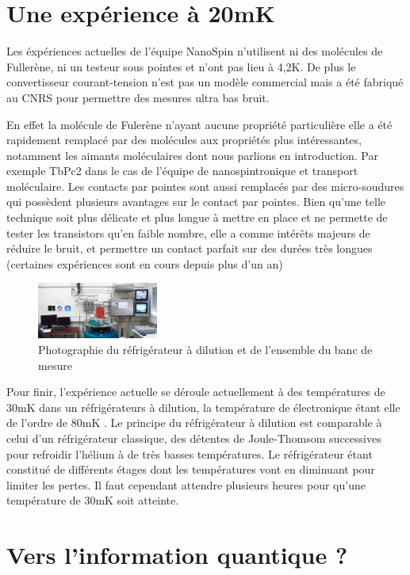 \section{Une expérience à 20mK}
Les éxpériences actuelles de l'équipe NanoSpin n'utilisent ni des molécules de Fullerène, ni un testeur sous pointes et n'ont pas lieu à 4,2K. De plus le convertisseur courant-tension n'est pas un modèle commercial mais a été fabriqué au CNRS pour permettre des mesures ultra bas bruit.

En effet la molécule de Fulerène n'ayant aucune propriété particulière elle a été rapidement remplacé par des molécules aux propriétés plus intéressantes, notamment les aimants moléculaires dont nous parlions en introduction. Par exemple TbPc2 dans le cas de l'équipe de nanospintronique et transport moléculaire.
Les contacts par pointes sont aussi remplacés par des micro-soudures qui possèdent plusieurs avantages sur le contact par pointes. Bien qu'une telle technique soit plus délicate et plus longue à mettre en place et ne permette de tester les transistors qu'en faible nombre, elle a comme intérêts majeurs de réduire le bruit, et permettre un contact parfait sur des durées très longues (certaines expériences sont en cours depuis plus d'un an)

\begin{figure}[h]
    \begin{center}
        \includegraphics[width=150px]{Images/5_Refrigerateur_Dillution.jpg}
        \caption{Photographie du réfrigérateur à dilution et de l'ensemble du banc de mesure}
    \end{center}
\end{figure}

Pour finir, l'expérience actuelle se déroule actuellement à des températures de 30mK dans un réfrigérateurs à dilution, la température de électronique étant elle de l'ordre de 80mK \cite{10}. Le principe du réfrigérateur à dilution est comparable à celui d'un réfrigérateur classique, des détentes de Joule-Thomsom successives pour refroidir l'hélium à de très basses températures. Le réfrigérateur étant constitué de différents étages dont les températures vont en diminuant pour limiter les pertes. Il faut cependant attendre plusieurs heures pour qu'une température de 30mK soit atteinte.
\section{Vers l'information quantique ?}

